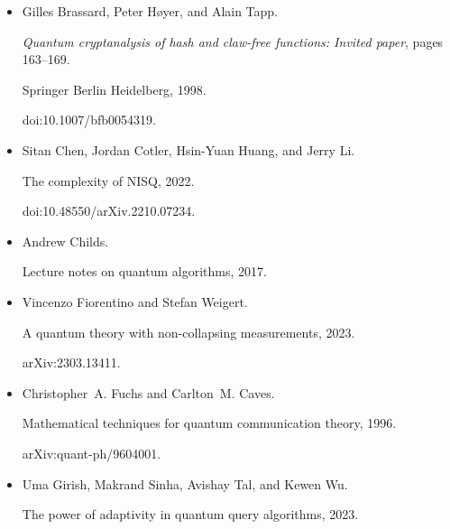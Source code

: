 \documentclass[10pt,a4paper]{article}
\begin{document}
\begin{itemize}
\emph{SIAM Journal on Computing}, 26(5):1510–1523, October 1997.


doi:10.1137/s0097539796300933.





\item[] 
[13]

Gilles Brassard, Peter Høyer, and Alain Tapp.


\emph{Quantum cryptanalysis of hash and claw-free functions: Invited
paper}, pages 163–169.


Springer Berlin Heidelberg, 1998.


doi:10.1007/bfb0054319.





\item[] 
[14]

Sitan Chen, Jordan Cotler, Hsin-Yuan Huang, and Jerry Li.


The complexity of NISQ, 2022.


doi:10.48550/arXiv.2210.07234.





\item[] 
[15]

Andrew Childs.


Lecture notes on quantum algorithms, 2017.





\item[] 
[16]

Vincenzo Fiorentino and Stefan Weigert.


A quantum theory with non-collapsing measurements, 2023.


arXiv:2303.13411.





\item[] 
[17]

Christopher A. Fuchs and Carlton M. Caves.


Mathematical techniques for quantum communication theory, 1996.


arXiv:quant-ph/9604001.





\item[] 
[18]

Uma Girish, Makrand Sinha, Avishay Tal, and Kewen Wu.


The power of adaptivity in quantum query algorithms, 2023.



\end{itemize}
\end{document}
